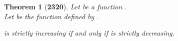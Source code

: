 \documentclass[preview]{standalone}
\newtheorem{theorem}{Theorem}
\begin{document}
\begin{theorem}[\textbf{2320}]
    Let \bm{$\gamma$} be a function .
    \\
    Let \bm{$\delta$} be the function  
    defined by 
    . 
    \begin{center}
        \bm{$\gamma[\alpha]$} is strictly increasing 
        if and only if 
        \bm{$\delta[\alpha]$} is strictly decreasing.
    \end{center}
\end{theorem}
\end{document}
